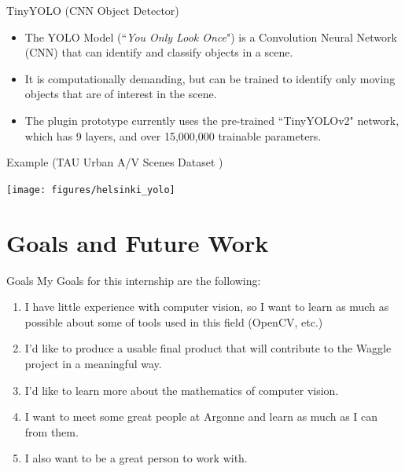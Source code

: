 \documentclass[10pt]{beamer}
\begin{document}
\begin{frame}{TinyYOLO (CNN Object Detector)}

\begin{itemize}

\item The YOLO Model (``\textit{You Only Look Once}") is a Convolution Neural Network (CNN) that can identify and classify objects in a scene.

\item It is computationally demanding, but can be trained to identify only moving objects that are of interest in the scene.

\item The plugin prototype currently uses the pre-trained ``TinyYOLOv2" network, which has 9 layers, and over 15,000,000 trainable parameters.\\[4mm]

\end{itemize}

\begin{exampleblock}{Example (TAU Urban A/V Scenes Dataset \cite{wang_curated_2021})}
\begin{center}
\texttt{[image: figures/helsinki\_yolo]}
\end{center}
\end{exampleblock}

\end{frame}

\section{Goals and Future Work}

\begin{frame}{Goals}
My Goals for this internship are the following:

\begin{enumerate}
\item I have little experience with computer vision, so I want to learn as much as possible about some of tools used in this field (OpenCV, etc.)

\item I'd like to produce a usable final product that will contribute to the Waggle project in a meaningful way.

\item I'd like to learn more about the mathematics of computer vision.

\item I want to meet some great people at Argonne and learn as much as I can from them.

\item I also want to be a great person to work with. 
\end{enumerate}
\end{frame}
\end{document}
